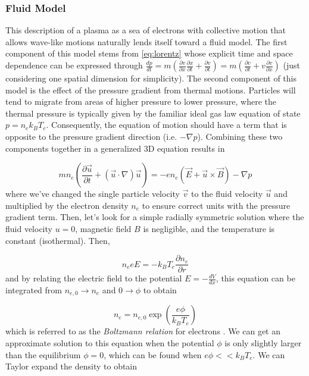 \subsubsection{Fluid Model}
This description of a plasma as a sea of electrons with collective motion that allows wave-like motions naturally lends itself toward a fluid model. The first component of this model stems from \cref{eq:lorentz} whose explicit time and space dependence can be expressed through $\frac{d p}{d t} = m (\frac{\partial v}{\partial x} \frac{\partial x}{\partial t} + \frac{\partial v}{\partial t}) = m (\frac{\partial v}{\partial t} + v \frac{\partial v}{\partial x})$ (just considering one spatial dimension for simplicity). The second component of this model is the effect of the pressure gradient from thermal motions. Particles will tend to migrate from areas of higher pressure to lower pressure, where the thermal pressure is typically given by the familiar ideal gas law equation of state $p = n_e k_B T_e$. Consequently, the equation of motion should have a term that is opposite to the pressure gradient direction (i.e. $- \nabla p$). Combining these two components together in a generalized 3D equation results in

\begin{equation}
	m n_e (\frac{\partial \vec{u}}{\partial t} + (\vec{u} \cdot \nabla) \vec{u}) = -e n_e (\vec{E} + \vec{u} \times \vec{B}) - \nabla p \label{eq:fluid}
\end{equation}
where we've changed the single particle velocity $\vec{v}$ to the fluid velocity $\vec{u}$ and multiplied by the electron density $n_e$ to ensure correct units with the pressure gradient term. Then, let's look for a simple radially symmetric solution where the fluid velocity $u = 0$, magnetic field $B$ is negligible, and the temperature is constant (isothermal). Then, 

\begin{equation}
	n_e e E = - k_B T_e \frac{\partial n_e}{\partial r}
\end{equation}
and by relating the electric field to the potential $E = - \frac{dV}{dx}$, this equation can be integrated from $n_{e,0} \rightarrow n_e$ and $0 \rightarrow \phi$ to obtain 

\begin{equation}
	n_e = n_{e,0} \exp(\frac{e \phi}{k_B T_e}) \label{eq:boltzmann}
\end{equation}
which is referred to as the \emph{Boltzmann relation} for electrons \cite{Chen_2015_Plasma}. We can get an approximate solution to this equation when the potential $\phi$ is only slightly larger than the equilibrium $\phi=0$, which can be found when $e \phi << k_B T_e$. We can Taylor expand the density to obtain 

